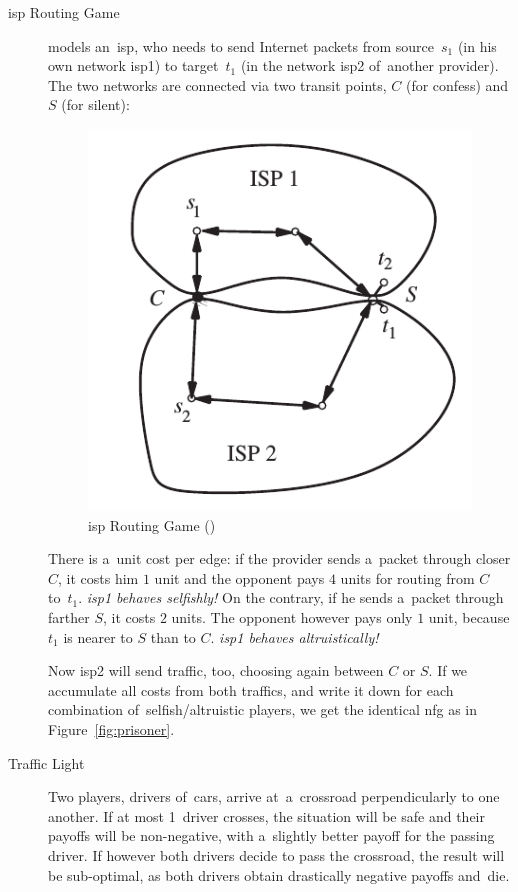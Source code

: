 \begin{description}
  \item [\acrshort{isp} Routing Game] models an~\acrfull{isp}, who needs to send Internet packets from source~$s_1$ (in his own network \acrshort{isp}1) to target~$t_1$ (in the network \acrshort{isp}2 of~another provider).
    The two networks are connected via two transit points, $C$ (for confess) and $S$ (for silent):
    \begin{figure}[H]
      \centering
      \includegraphics[width=.25\paperwidth]{../img/isp.png}
      \caption[\acrshort{isp} Routing Game]{\acrshort{isp} Routing Game (\cite{AGT07})}
      \label{fig:isp-routing}
    \end{figure}
    There is a~unit cost per edge:
    if the provider sends a~packet through closer $C$, it costs him $1$ unit and the opponent pays $4$ units for routing from $C$ to~$t_1$.
    \emph{\acrshort{isp}1 behaves selfishly!}
    On the contrary, if he sends a~packet through farther $S$, it costs $2$ units.
    The opponent however pays only $1$ unit, because $t_1$ is nearer to $S$ than to $C$.
    \emph{\acrshort{isp}1 behaves altruistically!}

    Now \acrshort{isp}2 will send traffic, too, choosing again between $C$ or $S$.
    If we accumulate all costs from both traffics, and write it down for each combination of~selfish/altruistic players, we get the identical \acrshort{nfg} as in Figure~\ref{fig:prisoner}.

  \item [Traffic Light]
    Two players, drivers of~cars, arrive at~a~crossroad perpendicularly to one another.
    If at most 1~driver crosses, the situation will be safe and their payoffs will be non-negative, with a~slightly better payoff for the passing driver.
    If however both drivers decide to pass the crossroad, the result will be sub-optimal, as both drivers obtain drastically negative payoffs and~die.


\end{description}
